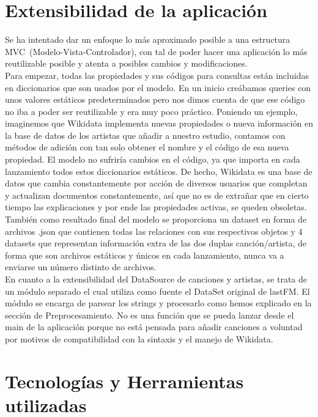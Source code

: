 \section{Extensibilidad de la aplicación}

Se ha intentado dar un enfoque lo más aproximado posible a una estructura MVC~(Modelo-Vista-Controlador), con tal de poder hacer una aplicación lo más reutilizable posible y atenta a posibles cambios y modificaciones.\\

Para empezar, todas las propiedades y sus códigos para consultas están incluidas en diccionarios que son usados por el modelo. En un inicio creábamos queries con unos valores estáticos predeterminados pero nos dimos cuenta de que ese código no iba a poder ser reutilizable y era muy poco práctico. Poniendo un ejemplo, imaginemos que Wikidata implementa nuevas propiedades o nueva información en la base de datos de los artistas que añadir a nuestro estudio, contamos con métodos de adición con tan solo obtener el nombre y el código de esa nueva propiedad. El modelo no sufriría cambios en el código, ya que importa en cada lanzamiento todos estos diccionarios estáticos. De hecho, Wikidata es una base de datos que cambia constantemente por acción de diversos usuarios que completan y actualizan documentos constantemente, así que no es de extrañar que en cierto tiempo las explicaciones y por ende las propiedades activas, se queden obsoletas.\\

También como resultado final del modelo se proporciona un dataset en forma de archivos .json que contienen todas las relaciones con sus respectivos objetos y 4 datasets que representan información extra de las dos duplas canción/artista, de forma que son archivos estáticos y únicos en cada lanzamiento, nunca va a enviarse un número distinto de archivos.\\

En cuanto a la extensibilidad del DataSource de canciones y artistas, se trata de un módulo separado el cual utiliza como fuente el DataSet original de lastFM. El módulo se encarga de parsear los strings y procesarlo como hemos explicado en la sección de Preprocesamiento. No es una función que se pueda lanzar desde el main de la aplicación porque no está pensada para añadir canciones a voluntad por motivos de compatibilidad con la sintaxis y el manejo de Wikidata.\\

\section{Tecnologías y Herramientas utilizadas}
\label{sec:tecnologias}

